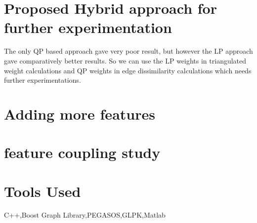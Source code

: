 \section*{Proposed Hybrid approach for further experimentation}
The only QP based approach gave very poor result, but however the LP approach gave comparatively better results. So we can use the LP weights in triangulated weight calculations and QP weights in edge dissimilarity calculations which needs further experimentations.

\section*{Adding more features}


\section*{feature coupling study}

\section*{Tools Used}
C++,Boost Graph Library,PEGASOS,GLPK,Matlab
